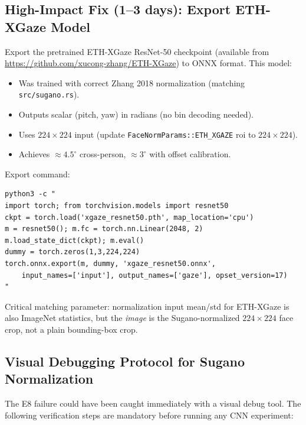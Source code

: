 \documentclass[11pt,a4paper]{article}
\begin{document}
\subsection{High-Impact Fix (1--3 days): Export ETH-XGaze Model}

Export the pretrained ETH-XGaze ResNet-50 checkpoint (available from \url{https://github.com/xucong-zhang/ETH-XGaze}) to ONNX format.
This model:
\begin{itemize}
  \item Was trained with correct Zhang 2018 normalization (matching \texttt{src/sugano.rs}).
  \item Outputs scalar (pitch, yaw) in radians (no bin decoding needed).
  \item Uses $224\times224$ input (update \texttt{FaceNormParams::ETH\_XGAZE} roi to $224\times224$).
  \item Achieves $\approx4.5^\circ$ cross-person, $\approx3^\circ$ with offset calibration.
\end{itemize}

Export command:
\begin{verbatim}
python3 -c "
import torch; from torchvision.models import resnet50
ckpt = torch.load('xgaze_resnet50.pth', map_location='cpu')
m = resnet50(); m.fc = torch.nn.Linear(2048, 2)
m.load_state_dict(ckpt); m.eval()
dummy = torch.zeros(1,3,224,224)
torch.onnx.export(m, dummy, 'xgaze_resnet50.onnx',
    input_names=['input'], output_names=['gaze'], opset_version=17)
"
\end{verbatim}

Critical matching parameter: normalization input mean/std for ETH-XGaze is also ImageNet statistics, but the \textit{image} is the Sugano-normalized $224\times224$ face crop, not a plain bounding-box crop.

\subsection{Visual Debugging Protocol for Sugano Normalization}

The E8 failure could have been caught immediately with a visual debug tool.
The following verification steps are mandatory before running any CNN experiment:
\end{document}
